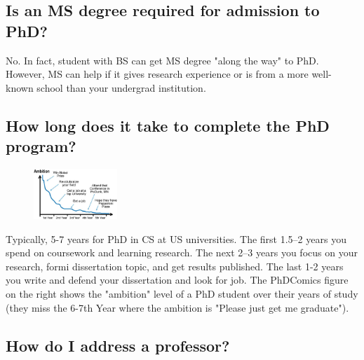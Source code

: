 \documentclass[11pt]{article}
\begin{document}
\subsection{Is an MS degree required for admission to PhD?}
No. In fact, student with BS can get MS degree "along the way" to PhD.  However, MS can help if it gives research experience or is from a more well-known school than your undergrad institution.
    

\subsection{How long does it take to complete the PhD program?}

\begin{figure}
    \vspace{-0.4in}
      \begin{center}
        \includegraphics[width=0.28\textwidth]{c4a.png}
      \end{center}
    \vspace{-0.2in}
    \end{figure}
    Typically, 5-7 years for PhD in CS at US universities.  The first 1.5--2 years you spend on coursework and learning research.  The next 2--3 years you focus on your research, formi dissertation topic, and get results published.  The last 1-2 years you write and defend your dissertation and look for job. The PhDComics figure on the right shows the "ambition" level of a PhD student over their years of study (they miss the 6-7th Year where the ambition is "Please just get me graduate").



\subsection{How do I address a professor?}
\end{document}
